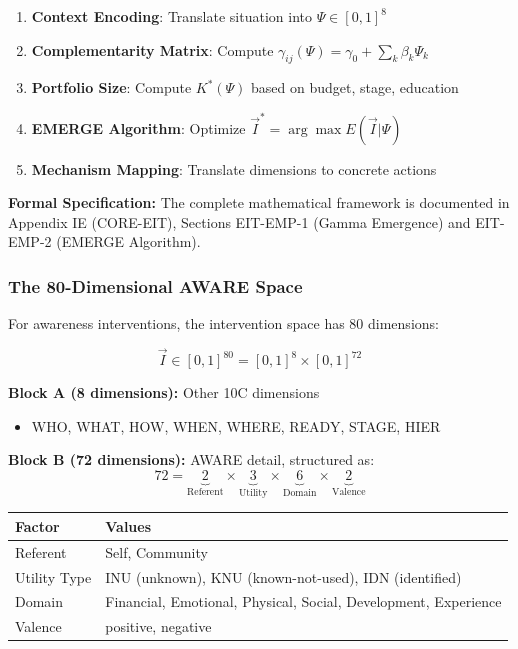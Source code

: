 \begin{enumerate}
    \item \textbf{Context Encoding}: Translate situation into $\Psi \in [0,1]^8$
    \item \textbf{Complementarity Matrix}: Compute $\gamma_{ij}(\Psi) = \gamma_0 + \sum_k \beta_k \Psi_k$
    \item \textbf{Portfolio Size}: Compute $K^*(\Psi)$ based on budget, stage, education
    \item \textbf{EMERGE Algorithm}: Optimize $\vec{I}^* = \arg\max E(\vec{I} | \Psi)$
    \item \textbf{Mechanism Mapping}: Translate dimensions to concrete actions
\end{enumerate}

\begin{cross-reference}
\textbf{Formal Specification:} The complete mathematical framework is documented in Appendix IE (CORE-EIT), Sections EIT-EMP-1 (Gamma Emergence) and EIT-EMP-2 (EMERGE Algorithm).
\end{cross-reference}

\subsubsection{The 80-Dimensional AWARE Space}
\label{subsubsec:80d-space}

For awareness interventions, the intervention space has 80 dimensions:

\begin{equation}
\vec{I} \in [0,1]^{80} = [0,1]^{8} \times [0,1]^{72}
\end{equation}

\textbf{Block A (8 dimensions):} Other 10C dimensions
\begin{itemize}[nosep]
    \item WHO, WHAT, HOW, WHEN, WHERE, READY, STAGE, HIER
\end{itemize}

\textbf{Block B (72 dimensions):} AWARE detail, structured as:
\begin{equation}
72 = \underbrace{2}_{\text{Referent}} \times \underbrace{3}_{\text{Utility}} \times \underbrace{6}_{\text{Domain}} \times \underbrace{2}_{\text{Valence}}
\end{equation}

\begin{center}
\small
\begin{tabular}{ll}
\textbf{Factor} & \textbf{Values} \\
\midrule
Referent & Self, Community \\
Utility Type & INU (unknown), KNU (known-not-used), IDN (identified) \\
Domain & Financial, Emotional, Physical, Social, Development, Experience \\
Valence & positive, negative \\
\end{tabular}
\end{center}

